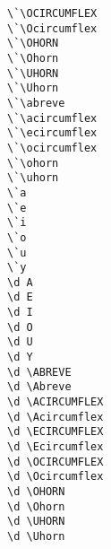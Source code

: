 \begin{multicols}{2}
\X{\`\OCIRCUMFLEX} \verb|\`\OCIRCUMFLEX| \\
\X{\`\Ocircumflex} \verb|\`\Ocircumflex| \\
\X{\`\OHORN} \verb|\`\OHORN| \\
\X{\`\Ohorn} \verb|\`\Ohorn| \\
\X{\`\UHORN} \verb|\`\UHORN| \\
\X{\`\Uhorn} \verb|\`\Uhorn| \\
\X{\`\abreve} \verb|\`\abreve| \\
\X{\`\acircumflex} \verb|\`\acircumflex| \\
\X{\`\ecircumflex} \verb|\`\ecircumflex| \\
\X{\`\ocircumflex} \verb|\`\ocircumflex| \\
\X{\`\ohorn} \verb|\`\ohorn| \\
\X{\`\uhorn} \verb|\`\uhorn| \\
 \verb|\`a| \\
 \verb|\`e| \\
 \verb|\`i| \\
 \verb|\`o| \\
 \verb|\`u| \\
 \verb|\`y| \\
 \verb|\d A| \\
 \verb|\d E| \\
 \verb|\d I| \\
 \verb|\d O| \\
 \verb|\d U| \\
 \verb|\d Y| \\
\X{\d \ABREVE} \verb|\d \ABREVE| \\
\X{\d \Abreve} \verb|\d \Abreve| \\
\X{\d \ACIRCUMFLEX} \verb|\d \ACIRCUMFLEX| \\
\X{\d \Acircumflex} \verb|\d \Acircumflex| \\
\X{\d \ECIRCUMFLEX} \verb|\d \ECIRCUMFLEX| \\
\X{\d \Ecircumflex} \verb|\d \Ecircumflex| \\
\X{\d \OCIRCUMFLEX} \verb|\d \OCIRCUMFLEX| \\
\X{\d \Ocircumflex} \verb|\d \Ocircumflex| \\
\X{\d \OHORN} \verb|\d \OHORN| \\
\X{\d \Ohorn} \verb|\d \Ohorn| \\
\X{\d \UHORN} \verb|\d \UHORN| \\
\X{\d \Uhorn} \verb|\d \Uhorn| \\

\end{multicols}
